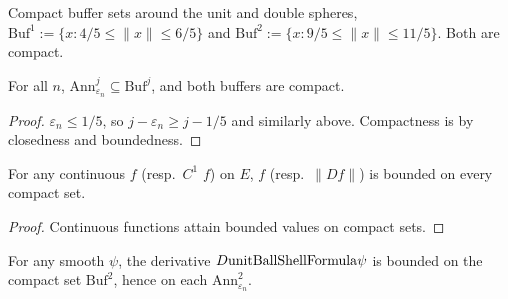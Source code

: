 \begin{definition}
\label{def:SmoothApproximationInternal_sphereOneControl}
\leanok
Compact buffer sets around the unit and double spheres,
$\mathrm{Buf}^1 := \{x : 4/5 \le \|x\| \le 6/5\}$ and
$\mathrm{Buf}^2 := \{x : 9/5 \le \|x\| \le 11/5\}$. Both are compact.
\end{definition}

\begin{lemma}
\label{lem:SmoothApproximationInternal_badAnnulusOne_subset_sphereOneCo}
\leanok
{}
For all $n$, $\mathrm{Ann}^j_{\varepsilon_n} \subseteq \mathrm{Buf}^j$, and
both buffers are compact.
\end{lemma}

\begin{proof}
\leanok
{}

$\varepsilon_n \le 1/5$, so $j - \varepsilon_n \ge j - 1/5$ and similarly
above. Compactness is by closedness and boundedness.
\end{proof}

\begin{theorem}
\label{thm:SmoothApproximationInternal_exists_fderiv_bound_on_compact}
\leanok
For any continuous $f$ (resp.\ $C^1$ $f$) on $E$, $f$ (resp.\ $\|Df\|$) is
bounded on every compact set.
\end{theorem}

\begin{proof}
\leanok

Continuous functions attain bounded values on compact sets.
\end{proof}

\begin{theorem}
\label{thm:SmoothApproximationInternal_exists_shellFormula_fderiv_bound}
\leanok
{}
For any smooth $\psi$, the derivative $D \mathrm{unitBallShellFormula} \psi$ is bounded
on the compact set $\mathrm{Buf}^2$, hence on each $\mathrm{Ann}^2_{\varepsilon_n}$.
\end{theorem}

